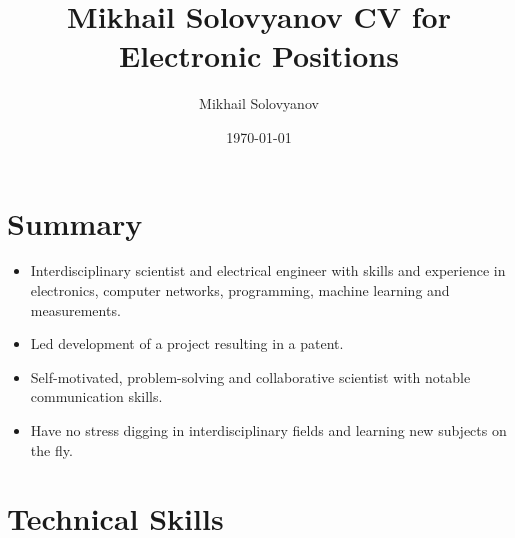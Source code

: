 \documentclass{article}
\title{ Mikhail Solovyanov CV for Electronic Positions}
\author{Mikhail Solovyanov}
\date{\today}
\begin{document}
 
 
\makecvtitle %
 
\section{Summary}
\begin{itemize}
\item Interdisciplinary scientist and electrical engineer with skills and experience in electronics, computer networks, programming, machine learning and measurements.
\item Led development of a  project resulting in a patent.
\item Self-motivated, problem-solving and collaborative scientist with notable communication skills.
\item Have no stress digging in interdisciplinary fields and learning new subjects on the fly.
\end{itemize}
 
\section{Technical Skills}
 
\end{document}
